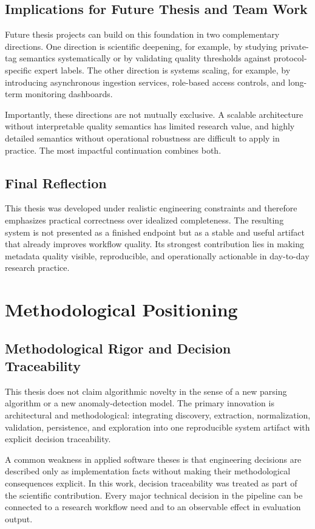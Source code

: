 \subsection{Implications for Future Thesis and Team Work}
Future thesis projects can build on this foundation in two complementary directions. One direction is scientific deepening, for example, by studying private-tag semantics systematically or by validating quality thresholds against protocol-specific expert labels. The other direction is systems scaling, for example, by introducing asynchronous ingestion services, role-based access controls, and long-term monitoring dashboards.

Importantly, these directions are not mutually exclusive. A scalable architecture without interpretable quality semantics has limited research value, and highly detailed semantics without operational robustness are difficult to apply in practice. The most impactful continuation combines both.

\subsection{Final Reflection}
This thesis was developed under realistic engineering constraints and therefore emphasizes practical correctness over idealized completeness. The resulting system is not presented as a finished endpoint but as a stable and useful artifact that already improves workflow quality. Its strongest contribution lies in making metadata quality visible, reproducible, and operationally actionable in day-to-day research practice.

\section{Methodological Positioning}
\subsection{Methodological Rigor and Decision Traceability}
This thesis does not claim algorithmic novelty in the sense of a new parsing algorithm or a new anomaly-detection model. The primary innovation is architectural and methodological: integrating discovery, extraction, normalization, validation, persistence, and exploration into one reproducible system artifact with explicit decision traceability.

A common weakness in applied software theses is that engineering decisions are described only as implementation facts without making their methodological consequences explicit. In this work, decision traceability was treated as part of the scientific contribution. Every major technical decision in the pipeline can be connected to a research workflow need and to an observable effect in evaluation output.

